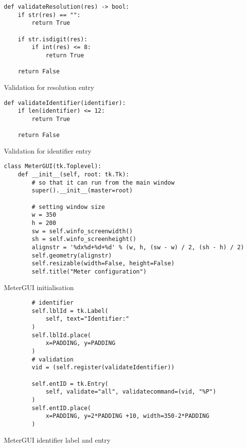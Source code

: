 \newpage
\begin{listing}[!ht]
    \begin{verbatim}
def validateResolution(res) -> bool:
    if str(res) == "":
        return True
    
    if str.isdigit(res):
        if int(res) <= 8:
            return True
        
    return False
    \end{verbatim}
    \caption{Validation for resolution entry}
    \label{sc:resolution-validation-func}
\end{listing}

\newpage
\begin{listing}[!ht]
    \begin{verbatim}
def validateIdentifier(identifier):
    if len(identifier) <= 12:
        return True
    
    return False
    \end{verbatim}
    \caption{Validation for identifier entry}
    \label{sc:id-validation-func}
\end{listing}

\newpage
\begin{listing}[!ht]
    \begin{verbatim}
class MeterGUI(tk.Toplevel):
    def __init__(self, root: tk.Tk):
        # so that it can run from the main window        
        super().__init__(master=root)
        
        # setting window size
        w = 350
        h = 200
        sw = self.winfo_screenwidth()
        sh = self.winfo_screenheight()
        alignstr = '%dx%d+%d+%d' % (w, h, (sw - w) / 2, (sh - h) / 2)
        self.geometry(alignstr)
        self.resizable(width=False, height=False)
        self.title("Meter configuration")
    \end{verbatim}
    \caption{MeterGUI initialisation}
    \label{sc:metergui-init}
\end{listing}

\newpage
\begin{listing}[!ht]
    \begin{verbatim}
        # identifier
        self.lblId = tk.Label(
            self, text="Identifier:"
        )
        self.lblId.place(
            x=PADDING, y=PADDING
        )
        # validation
        vid = (self.register(validateIdentifier))
        
        self.entID = tk.Entry(
            self, validate="all", validatecommand=(vid, "%P")
        )
        self.entID.place(
            x=PADDING, y=2*PADDING +10, width=350-2*PADDING
        )
    \end{verbatim}
    \caption{MeterGUI identifier label and entry}
    \label{sc:metergui-id-lbl-ent}
\end{listing}

